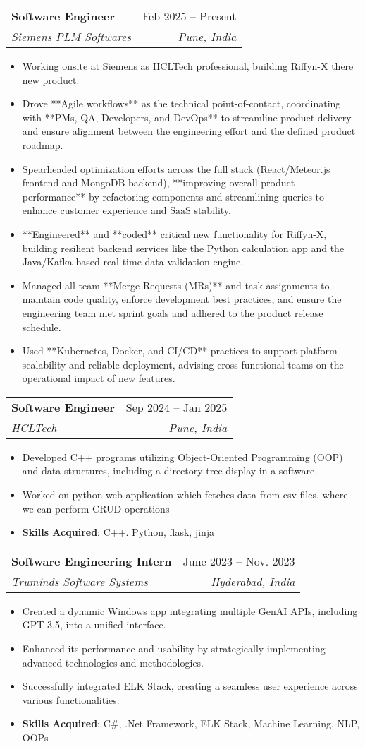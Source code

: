 \documentclass[letterpaper,11pt]{article}
\makeatletter
\newcommand{\resumeItem}[1]{
  \item\small{
    {#1 \vspace{-2pt}}
  }
}
\newcommand{\resumeSubheading}[4]{
  \vspace{-2pt}\item
    \begin{tabular*}{0.97\textwidth}[t]{l@{\extracolsep{\fill}}r}
      \textbf{#1} & #2 \\
      \textit{\small#3} & \textit{\small #4} \\
    \end{tabular*}\vspace{-7pt}
}
\newcommand{\resumeItemListStart}{\begin{itemize}}
\newcommand{\resumeItemListEnd}{\end{itemize}\vspace{-5pt}}
\makeatother
\begin{document}
  \resumeSubheading
  {Software Engineer}{Feb 2025 -- Present}
  {Siemens PLM Softwares}{Pune, India}
  \resumeItemListStart
        \resumeItem{Working onsite at Siemens as HCLTech professional, building Riffyn-X there new product.  }
        \resumeItem{Drove **Agile workflows** as the technical point-of-contact, coordinating with **PMs, QA, Developers, and DevOps** to streamline product delivery and ensure alignment between the engineering effort and the defined product roadmap.}
        \resumeItem{Spearheaded optimization efforts across the full stack (React/Meteor.js frontend and MongoDB backend), **improving overall product performance** by refactoring components and streamlining queries to enhance customer experience and $\text{SaaS}$ stability.}
        \resumeItem{**Engineered** and **coded** critical new functionality for Riffyn-X, building resilient backend services like the Python calculation app and the Java/Kafka-based real-time data validation engine.}
        \resumeItem{Managed all team **Merge Requests (MRs)** and task assignments to maintain code quality, enforce development best practices, and ensure the engineering team met sprint goals and adhered to the product release schedule.}
        \resumeItem{Used **Kubernetes, Docker, and CI/CD** practices to support platform scalability and reliable deployment, advising cross-functional teams on the operational impact of new features.}
  \resumeItemListEnd

    \resumeSubheading
      {Software Engineer}{Sep 2024 -- Jan 2025}
      {HCLTech}{Pune, India}
      \resumeItemListStart
        \resumeItem{Developed C++ programs utilizing Object-Oriented Programming (OOP) and data structures, including a directory tree display in a software.}
        \resumeItem{Worked on python web application which fetches data from csv files. where we can perform CRUD operations}
        \resumeItem{\textbf{Skills Acquired}: C++. Python, flask, jinja}
      \resumeItemListEnd
  
    \resumeSubheading
      {Software Engineering Intern}{June 2023 -- Nov. 2023}
      {Truminds Software Systems}{Hyderabad, India}
      \resumeItemListStart
        \resumeItem{Created a dynamic Windows app integrating multiple GenAI APIs, including GPT-3.5, into a unified interface.}
        \resumeItem{Enhanced its performance and usability by strategically implementing advanced technologies and methodologies.}
        \resumeItem{Successfully integrated ELK Stack, creating a seamless user experience across various functionalities.}
        \resumeItem{\textbf{Skills Acquired}: C\#, .Net Framework, ELK Stack, Machine Learning, NLP, OOPs}
    \resumeItemListEnd
\end{document}
